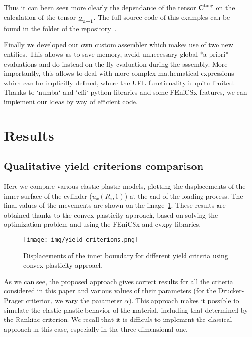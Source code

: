 \documentclass[12pt]{article}
\begin{document}
Thus it can been seen more clearly the dependance of the tensor $\mathbf{C}^\text{tang}$ on the calculation of the tensor $\underline{\underline{\sigma}}_{n+1}$. The full source code of this examples can be found in the  folder of the repository~\parencite{convex-plasticity}.

Finally we developed our own custom assembler which makes use of two new entities. This allows us to save memory, avoid unnecessary global *a priori* evaluations and do instead on-the-fly evaluation during the assembly. More importantly, this allows to deal with more complex mathematical expressions, which can be implicitly defined, where the UFL functionality is quite limited. Thanks to `numba` and `cffi` python libraries and some FEniCSx features, we can implement our ideas by way of efficient code. 

\newpage
\section{Results}
\label{sec:results}

\subsection{Qualitative yield criterions comparison}

Here we compare various elastic-plastic models, plotting the displacements of the inner surface of the cylinder ($u_x(R_i, 0)$) at the end of the loading process. The final values of the movements are shown on the image~\ref{fig:yield_criteria}. These results are obtained thanks to the convex plasticity approach, based on solving the optimization problem and using the FEniCSx and cvxpy libraries.
\begin{figure}[H]
    \center
    \texttt{[image: img/yield\_criterions.png]}
    \caption{Displacements of the inner boundary for different yield criteria using convex plasticity approach}
    \label{fig:yield_criteria}
\end{figure}
As we can see, the proposed approach gives correct results for all the criteria considered in this paper and various values of their parameters (for the Drucker-Prager criterion, we vary the parameter $\alpha$). This approach makes it possible to simulate the elastic-plastic behavior of the material, including that determined by the Rankine criterion. We recall that it is difficult to implement the classical approach in this case, especially in the three-dimensional one.
\end{document}
